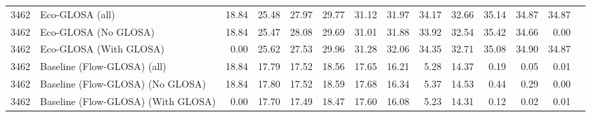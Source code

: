 \begin{table}[ht]
{\begin{tabular}{llrrrrrrrrrrrr}
        3462 & Eco-GLOSA (all)                    & 18.84 & 25.48 & 27.97 & 29.77 & 31.12 & 31.97 & 34.17 & 32.66 & 35.14 & 34.87 & 34.87 \\
        3462 & Eco-GLOSA (No GLOSA)               & 18.84 & 25.47 & 28.08 & 29.69 & 31.01 & 31.88 & 33.92 & 32.54 & 35.42 & 34.66 & 0.00 \\
        3462 & Eco-GLOSA (With GLOSA)             & 0.00 & 25.62 & 27.53 & 29.96 & 31.28 & 32.06 & 34.35 & 32.71 & 35.08 & 34.90 & 34.87 \\
        3462 & Baseline (Flow-GLOSA) (all)        & 18.84 & 17.79 & 17.52 & 18.56 & 17.65 & 16.21 & 5.28 & 14.37 & 0.19 & 0.05 & 0.01 \\
        3462 & Baseline (Flow-GLOSA) (No GLOSA)   & 18.84 & 17.80 & 17.52 & 18.59 & 17.68 & 16.34 & 5.37 & 14.53 & 0.44 & 0.29 & 0.00 \\
        3462 & Baseline (Flow-GLOSA) (With GLOSA) & 0.00 & 17.70 & 17.49 & 18.47 & 17.60 & 16.08 & 5.23 & 14.31 & 0.12 & 0.02 & 0.01 \\
        \bottomrule
      \end{tabular}
    }
\end{table}

